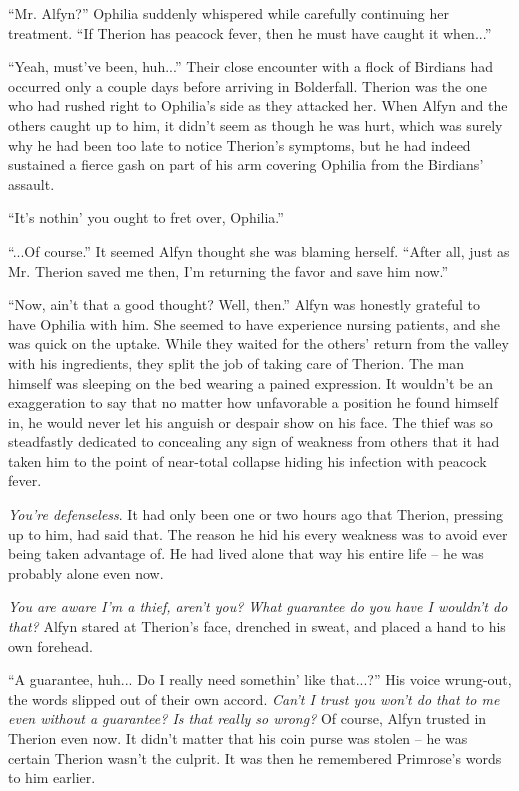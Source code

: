 ``Mr. Alfyn?'' Ophilia suddenly whispered while carefully continuing her treatment. ``If Therion has peacock fever, then he must have caught it when...''

``Yeah, must've been, huh...'' Their close encounter with a flock of Birdians had occurred only a couple days before arriving in Bolderfall. Therion was the one who had rushed right to Ophilia's side as they attacked her. When Alfyn and the others caught up to him, it didn't seem as though he was hurt, which was surely why he had been too late to notice Therion's symptoms, but he had indeed sustained a fierce gash on part of his arm covering Ophilia from the Birdians' assault. 

``It's nothin' you ought to fret over, Ophilia.''

``...Of course.'' It seemed Alfyn thought she was blaming herself. ``After all, just as Mr. Therion saved me then, I'm returning the favor and save him now.''

``Now, ain't that a good thought? Well, then.'' Alfyn was honestly grateful to have Ophilia with him. She seemed to have experience nursing patients, and she was quick on the uptake. While they waited for the others' return from the valley with his ingredients, they split the job of taking care of Therion. The man himself was sleeping on the bed wearing a pained expression. It wouldn't be an exaggeration to say that no matter how unfavorable a position he found himself in, he would never let his anguish or despair show on his face. The thief was so steadfastly dedicated to concealing any sign of weakness from others that it had taken him to the point of near-total collapse hiding his infection with peacock fever.

\emph{You're defenseless}. It had only been one or two hours ago that Therion, pressing up to him, had said that. The reason he hid his every weakness was to avoid ever being taken advantage of. He had lived alone that way his entire life -- he was probably alone even now.

\emph{You are aware I'm a thief, aren't you? What guarantee do you have I wouldn't do that?} Alfyn stared at Therion's face, drenched in sweat, and placed a hand to his own forehead.

``A guarantee, huh... Do I really need somethin' like that...?'' His voice wrung-out, the words slipped out of their own accord. \emph{Can't I trust you won't do that to me even without a guarantee? Is that really so wrong?} Of course, Alfyn trusted in Therion even now. It didn't matter that his coin purse was stolen -- he was certain Therion wasn't the culprit. It was then he remembered Primrose's words to him earlier.

